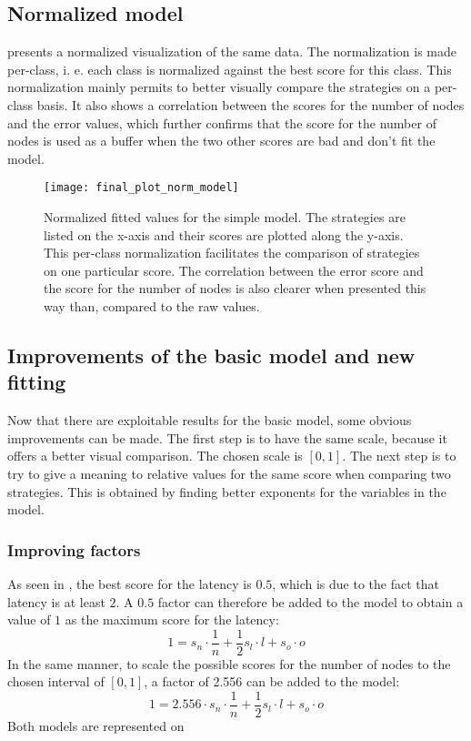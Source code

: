 \FloatBarrier
\subsection{Normalized model}
 presents a normalized visualization of the same
data. The normalization is made per-class, i. e. each class is normalized
against the best score for this class. This normalization mainly permits to
better visually compare the strategies on a per-class basis. It also shows a
correlation between the scores for the number of nodes and the error values,
which further confirms that the score for the number of nodes is used as a
buffer when the two other scores are bad and don't fit the model.


\begin{figure}[h]
    \centering
    \texttt{[image: final\_plot\_norm\_model]}
    \caption{Normalized fitted values for the simple model. The strategies are listed
    on the x-axis and their scores are plotted along the y-axis. 
    This per-class normalization facilitates the comparison of strategies on one
    particular score.
    The correlation between the error score and the score for the number of
    nodes is also clearer when presented this way than, compared to the raw
    values.
    }
    \label{fig:recapTestsPlotNorm}
\end{figure}

\FloatBarrier
\subsection{Improvements of the basic model and new fitting}
\label{ssec:fittingImproved}
Now that there are exploitable results for the basic model, some obvious
improvements can be made. The first step is to have the same scale, because it
offers a better visual comparison. The chosen scale is \([0,1]\). The next step
is to try to give a meaning to relative values for the same score when comparing
two strategies. This is obtained by finding better exponents for the variables
in the model.

\subsubsection{Improving factors}
As seen in , the best score for
the latency is \(0.5\), which is due to the fact that latency is at least \(2\).
A \(0.5\) factor can therefore be added to the model to obtain a value of \(1\)
as the maximum score for the latency:
\[1 = s_n \cdot \frac{1}{n} + \frac{1}{2} s_l\cdot l + s_o\cdot o\]
In the same manner, to scale the possible scores for the number of nodes to the
chosen interval of \([0,1]\), a factor of 2.556 can be added to the model:
\[1 = 2.556\cdot s_n \cdot \frac{1}{n} + \frac{1}{2} s_l\cdot l + s_o\cdot o\]
Both models are represented on 

